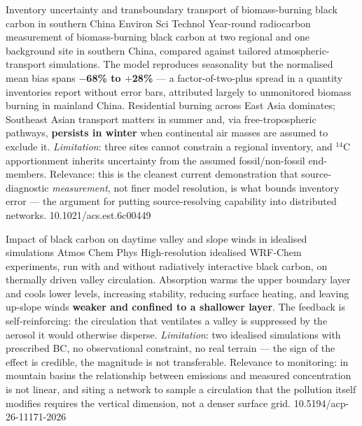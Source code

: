 \documentclass[10pt]{article}
\begin{document}

{Inventory uncertainty and transboundary transport of biomass-burning black carbon in
southern China}
{Environ Sci Technol}
{Year-round radiocarbon measurement of biomass-burning black carbon at two regional and
one background site in southern China, compared against tailored atmospheric-transport
simulations. The model reproduces seasonality but the normalised mean bias spans
\textbf{$-$68\% to $+$28\%} --- a factor-of-two-plus spread in a quantity inventories
report without error bars, attributed largely to unmonitored biomass burning in mainland
China. Residential burning across East Asia dominates; Southeast Asian transport matters
in summer and, via free-tropospheric pathways, \textbf{persists in winter} when
continental air masses are assumed to exclude it. \emph{Limitation}: three sites cannot
constrain a regional inventory, and $^{14}$C apportionment inherits uncertainty from the
assumed fossil/non-fossil end-members. Relevance: this is the cleanest current
demonstration that source-diagnostic \emph{measurement}, not finer model resolution, is
what bounds inventory error --- the argument for putting source-resolving capability into
distributed networks.}
{10.1021/acs.est.6c00449}

{Impact of black carbon on daytime valley and slope winds in idealised simulations}
{Atmos Chem Phys}
{High-resolution idealised WRF-Chem experiments, run with and without radiatively
interactive black carbon, on thermally driven valley circulation. Absorption warms the
upper boundary layer and cools lower levels, increasing stability, reducing surface
heating, and leaving up-slope winds \textbf{weaker and confined to a shallower layer}.
The feedback is self-reinforcing: the circulation that ventilates a valley is suppressed
by the aerosol it would otherwise disperse. \emph{Limitation}: two idealised simulations
with prescribed BC, no observational constraint, no real terrain --- the sign of the
effect is credible, the magnitude is not transferable. Relevance to monitoring: in
mountain basins the relationship between emissions and measured concentration is not
linear, and siting a network to sample a circulation that the pollution itself modifies
requires the vertical dimension, not a denser surface grid.}
{10.5194/acp-26-11171-2026}
\end{document}
